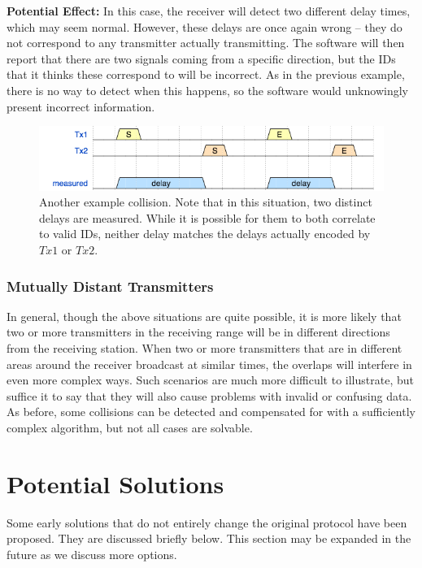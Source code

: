\documentclass[12pt]{article}
\begin{document}
{\bf Potential Effect:}
In this case, the receiver will detect two different delay times, which may
seem normal. However, these delays are once again wrong -- they do not
correspond to any transmitter actually transmitting.
The software will then report that there are two signals coming from a
specific direction, but the IDs that it thinks these correspond to will
be incorrect.
As in the previous example, there is no way to detect when this happens, so the
software would unknowingly present incorrect information.

\begin{figure}[h]
	\centering
		\includegraphics[scale=0.7]{collision2}
		
		\caption{Another example collision. Note that in this situation,
		two distinct delays are measured. While it is possible for them
		to both correlate to valid IDs, neither delay matches the delays
		actually encoded by $Tx1$ or $Tx2$.}
\end{figure}

\subsubsection{Mutually Distant Transmitters}

In general, though the above situations are quite possible, it is more likely
that two or more transmitters in the receiving range will be in different
directions from the receiving station.
When two or more transmitters that are in different areas around the receiver
broadcast at similar times, the overlaps will interfere in even more complex
ways.
Such scenarios are much more difficult to illustrate, but suffice it to say
that they will also cause problems with invalid or confusing data.
As before, some collisions can be detected and compensated for with a
sufficiently complex algorithm, but not all cases are solvable.

\section{Potential Solutions}

Some early solutions that do not entirely change the original protocol have
been proposed. They are discussed briefly below. This section may be expanded
in the future as we discuss more options.
\end{document}
